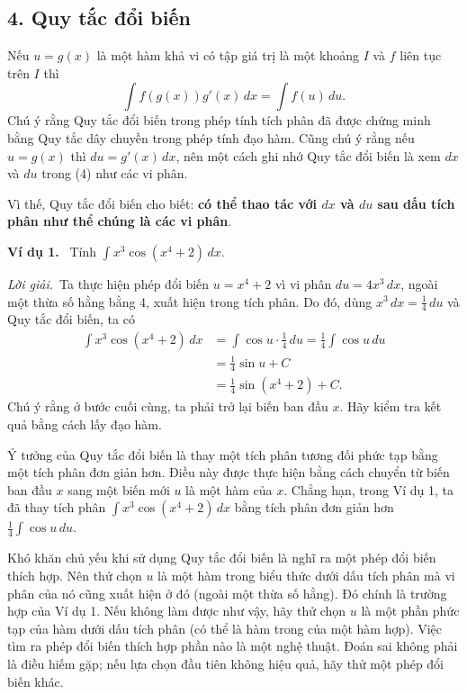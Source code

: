 \documentclass[12pt,a4paper]{article}
\newcommand{\ex}[1]{\par\medskip\noindent\textbf{Ví dụ #1.}\ }
\newcommand{\sol}{\par\nopagebreak[4]\noindent\textit{Lời giải.}\ }
\begin{document}
\subsection*{4. Quy tắc đổi biến}
Nếu $u=g(x)$ là một hàm khả vi có tập giá trị là một khoảng $I$ và $f$ liên tục trên $I$ thì
\[\boxed{\displaystyle\int f(g(x))g'(x)\,dx=\int f(u)\,du.}\]
Chú ý rằng Quy tắc đổi biến trong phép tính tích phân đã được chứng minh bằng Quy tắc dây chuyền trong phép tính đạo hàm. Cũng chú ý rằng nếu $u=g(x)$ thì $du=g'(x)\,dx$, nên một cách ghi nhớ Quy tắc đổi biến là xem $dx$ và $du$ trong (4) như các vi phân.

Vì thế, Quy tắc đổi biến cho biết: \textbf{có thể thao tác với $dx$ và $du$ sau dấu tích phân như thể chúng là các vi phân}.

\ex{1} Tính $\displaystyle\int x^3\cos(x^4+2)\,dx$.
\sol Ta thực hiện phép đổi biến $u=x^4+2$ vì vi phân $du=4x^3\,dx$, ngoài một thừa số hằng bằng 4, xuất hiện trong tích phân. Do đó, dùng $x^3\,dx=\frac14\,du$ và Quy tắc đổi biến, ta có
\begin{align*}
\int x^3\cos(x^4+2)\,dx&=\int\cos u\cdot\frac14\,du=\frac14\int\cos u\,du\\
&=\frac14\sin u+C\\
&=\frac14\sin(x^4+2)+C.
\end{align*}
Chú ý rằng ở bước cuối cùng, ta phải trở lại biến ban đầu $x$. Hãy kiểm tra kết quả bằng cách lấy đạo hàm.

Ý tưởng của Quy tắc đổi biến là thay một tích phân tương đối phức tạp bằng một tích phân đơn giản hơn. Điều này được thực hiện bằng cách chuyển từ biến ban đầu $x$ sang một biến mới $u$ là một hàm của $x$. Chẳng hạn, trong Ví dụ 1, ta đã thay tích phân $\int x^3\cos(x^4+2)\,dx$ bằng tích phân đơn giản hơn $\frac14\int\cos u\,du$.

Khó khăn chủ yếu khi sử dụng Quy tắc đổi biến là nghĩ ra một phép đổi biến thích hợp. Nên thử chọn $u$ là một hàm trong biểu thức dưới dấu tích phân mà vi phân của nó cũng xuất hiện ở đó (ngoài một thừa số hằng). Đó chính là trường hợp của Ví dụ 1. Nếu không làm được như vậy, hãy thử chọn $u$ là một phần phức tạp của hàm dưới dấu tích phân (có thể là hàm trong của một hàm hợp). Việc tìm ra phép đổi biến thích hợp phần nào là một nghệ thuật. Đoán sai không phải là điều hiếm gặp; nếu lựa chọn đầu tiên không hiệu quả, hãy thử một phép đổi biến khác.
\end{document}
